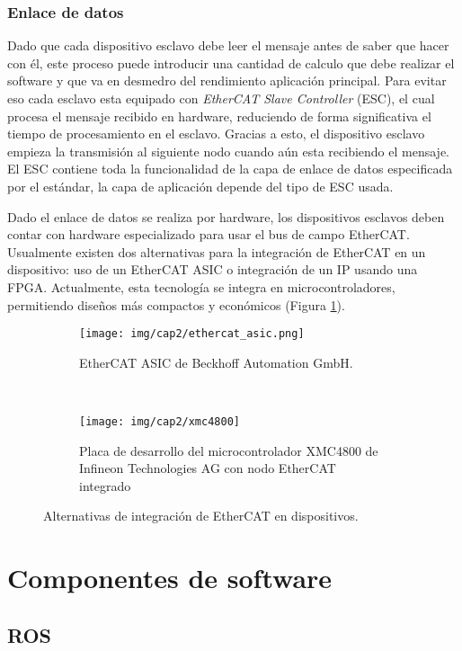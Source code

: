 \subsubsection{Enlace de datos}

Dado que cada dispositivo esclavo debe leer el mensaje antes de saber que hacer con él, este proceso puede introducir una cantidad de calculo que debe realizar el software y que va en desmedro del rendimiento aplicación principal. Para evitar eso cada esclavo esta equipado con \textit{EtherCAT Slave Controller} (ESC), el cual procesa el mensaje recibido en hardware, reduciendo de forma significativa el tiempo de procesamiento en el esclavo. Gracias a esto, el dispositivo esclavo empieza la transmisión al siguiente nodo cuando aún esta recibiendo el mensaje. El ESC contiene toda la funcionalidad de la capa de enlace de datos especificada por el estándar, la capa de aplicación depende del tipo de ESC usada.

Dado el enlace de datos se realiza por hardware, los dispositivos esclavos deben contar con hardware especializado para usar el bus de campo EtherCAT. Usualmente existen dos alternativas para la integración de EtherCAT en un dispositivo: uso de un EtherCAT ASIC o integración de un IP usando una FPGA. Actualmente, esta tecnología se integra en microcontroladores, permitiendo diseños más compactos y económicos (Figura \ref{cap2_ethercat}).

\begin{figure}[H]
  \centering
  \begin{subfigure}[b]{0.4\textwidth}
    \texttt{[image: img/cap2/ethercat\_asic.png]}
    \caption{EtherCAT ASIC de Beckhoff Automation GmbH.}
    \end{subfigure}%
    ~
  \begin{subfigure}[b]{0.4\textwidth}
    \texttt{[image: img/cap2/xmc4800]}
    \caption{Placa de desarrollo del microcontrolador XMC4800 de Infineon Technologies AG con nodo EtherCAT integrado}
    \end{subfigure}
  \caption{Alternativas de integración de EtherCAT en dispositivos.}
  \label{cap2_ethercat}
\end{figure}

\section{Componentes de software}

\subsection{ROS}

